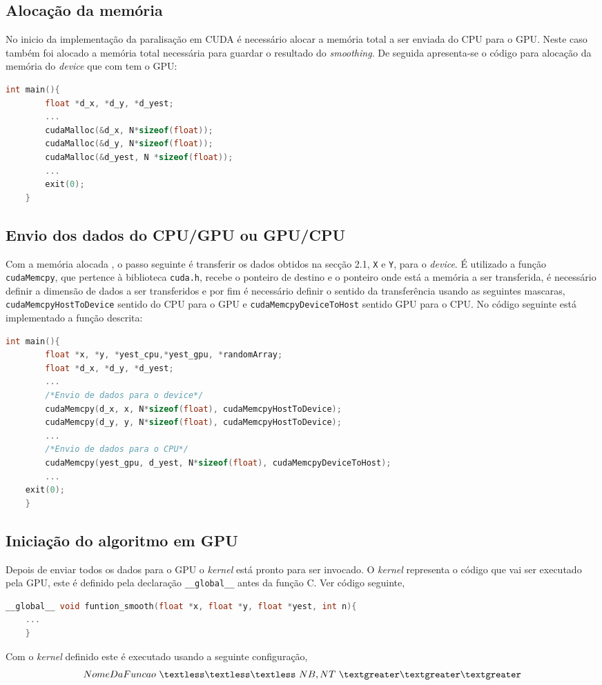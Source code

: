 \documentclass[11pt]{article}
\numberwithin{equation}{section}
\begin{document}
\subsection{Alocação da memória}
No inicio da implementação da paralisação em CUDA é necessário alocar a memória total a ser enviada do CPU para o GPU. Neste caso também foi alocado a memória total necessária para guardar o resultado do \textit{smoothing}. De seguida apresenta-se o código para alocação da memória do \textit{device} que com tem o GPU:
	\begin{lstlisting}[language=C]
	int main(){
		float *d_x, *d_y, *d_yest;
		...
		cudaMalloc(&d_x, N*sizeof(float)); 
		cudaMalloc(&d_y, N*sizeof(float));
		cudaMalloc(&d_yest, N *sizeof(float));
		...
		exit(0);
	}
	\end{lstlisting}
 
\subsection{Envio dos dados do CPU/GPU ou GPU/CPU}

Com a memória alocada , o passo seguinte é transferir os dados obtidos na secção 2.1, \texttt{X} e \texttt{Y}, para o \textit{device}. É utilizado a função \texttt{cudaMemcpy}, que pertence à biblioteca \texttt{cuda.h}, recebe o ponteiro de destino e o ponteiro onde está a memória a ser transferida, é necessário definir a dimensão de dados a ser transferidos e por fim é necessário definir o sentido da transferência usando as seguintes mascaras, \texttt{cudaMemcpyHostToDevice} sentido do CPU para o GPU e \texttt{cudaMemcpyDeviceToHost} sentido GPU para o CPU. No código seguinte está implementado a função descrita:
	\begin{lstlisting}[language=C]
	int main(){
		float *x, *y, *yest_cpu,*yest_gpu, *randomArray;
		float *d_x, *d_y, *d_yest;
		...
		/*Envio de dados para o device*/
		cudaMemcpy(d_x, x, N*sizeof(float), cudaMemcpyHostToDevice);
		cudaMemcpy(d_y, y, N*sizeof(float), cudaMemcpyHostToDevice);
		...
		/*Envio de dados para o CPU*/
		cudaMemcpy(yest_gpu, d_yest, N*sizeof(float), cudaMemcpyDeviceToHost);
		...
	exit(0);
	}
	\end{lstlisting}
\subsection{Iniciação do algoritmo em GPU}

Depois de enviar todos os dados para o GPU o \textit{kernel} está pronto para ser invocado. O \textit{kernel} representa o código que vai ser executado pela GPU, este é definido pela declaração \texttt{\_\_global\_\_} antes da função C. Ver código seguinte,
	\begin{lstlisting}[language=C]
	__global__ void funtion_smooth(float *x, float *y, float *yest, int n){
	...
	}
	\end{lstlisting}
Com o \textit{kernel} definido este é executado usando a seguinte configuração, 
	\vspace{-3mm}
	\begin{equation}
NomeDaFuncao~ \textless\textless\textless ~NB,NT ~\textgreater\textgreater\textgreater
	\end{equation}
\end{document}
